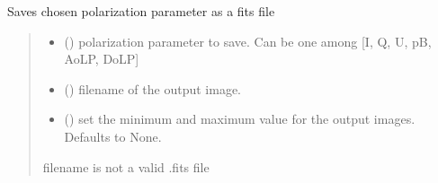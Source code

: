 \documentclass[letterpaper,10pt,english]{sphinxmanual}
\begin{document}
\begin{fulllineitems}
\begin{fulllineitems}
\label{\detokenize{micropolarray:micropolarray.micropol_image.MicropolImage.save_param_as_fits}}
\pysigstartsignatures
{}
\pysigstopsignatures
\sphinxAtStartPar
Saves chosen polarization parameter as a fits file
\begin{quote}\begin{description}
\begin{itemize}
\item {} 
\sphinxAtStartPar
{} () \textendash{} polarization parameter to save. Can be one among {[}I, Q, U, pB, AoLP, DoLP{]}

\item {} 
\sphinxAtStartPar
{} () \textendash{} filename of the output image.

\item {} 
\sphinxAtStartPar
{} (\sphinxstyleliteralemphasis{\sphinxupquote{{[}}}\sphinxstyleliteralemphasis{\sphinxupquote{, }}\sphinxstyleliteralemphasis{\sphinxupquote{{]}}}\sphinxstyleliteralemphasis{\sphinxupquote{, }}) \textendash{} set the minimum and maximum value for the output images. Defaults to None.

\end{itemize}

\sphinxAtStartPar
{} \textendash{} filename is not a valid .fits file

\end{description}\end{quote}


\end{fulllineitems}
\end{fulllineitems}
\end{document}
